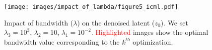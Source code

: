 \begin{figure}[h]
    \centering
    \setlength{\tabcolsep}{0pt}
    \texttt{[image: images/impact\_of\_lambda/figure5\_icml.pdf]}
    \vspace{-3mm}
    \caption{ 
        Impact of bandwidth ($\lambda$) on the denoised latent ($z_0$). We set $\lambda_3 = 10^3$, $\lambda_2 = 10$, $\lambda_1 = 10^{-2}$. \textcolor{red}{Highlighted} images show the optimal bandwidth value corresponding to the $k^{th}$ optimization.
    }
    \label{fig:impact_of_lambda}
    \vspace{-3mm}
\end{figure}

